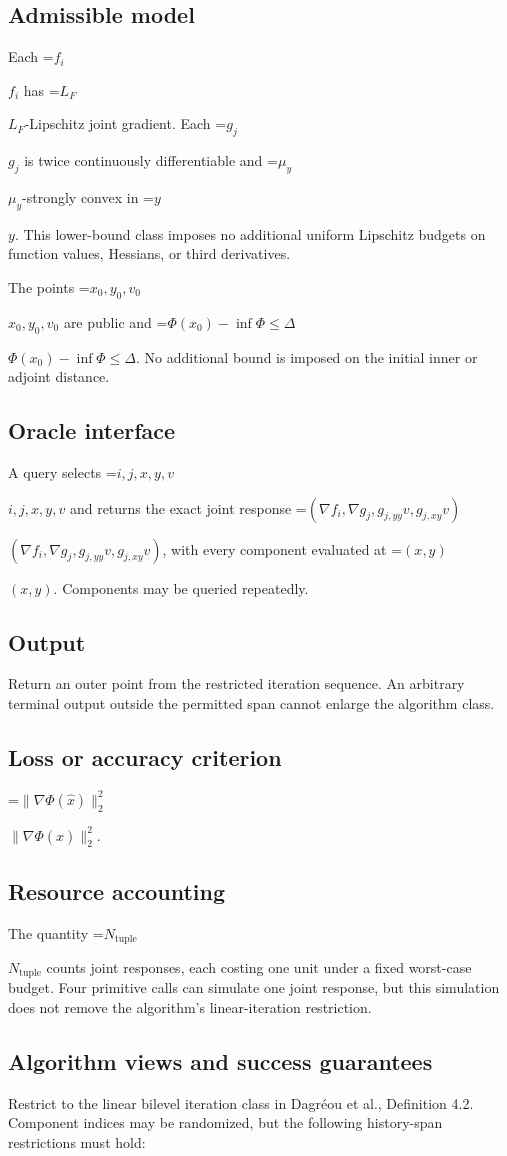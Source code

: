 \documentclass[10pt,a4paper]{article}
\newcommand{\AtlasMath}[1]{\par\begingroup\centering\setbox0=\hbox{$\displaystyle #1$}\ifdim\wd0>1.4\linewidth\typeout{ATLAS WIDE FORMULA: \the\wd0}\fi\ifdim\wd0>\linewidth\resizebox{\linewidth}{!}{\box0}\else\box0\fi\par\endgroup}
\newcommand{\AtlasInlineMath}[1]{\begingroup\setbox0=\hbox{$#1$}\ifdim\wd0>.4\linewidth\endgroup\AtlasMath{#1}\else\endgroup$#1$\fi}
\begin{document}
\subsection{Admissible model}
Each \AtlasInlineMath{f_i} has \AtlasInlineMath{L_F}-Lipschitz joint gradient. Each \AtlasInlineMath{g_j} is twice continuously differentiable and \AtlasInlineMath{\mu_y}-strongly convex in \AtlasInlineMath{y}. This lower-bound class imposes no additional uniform Lipschitz budgets on function values, Hessians, or third derivatives.

The points \AtlasInlineMath{x_0,y_0,v_0} are public and \AtlasInlineMath{\Phi(x_0)-\inf\Phi\le\Delta}. No additional bound is imposed on the initial inner or adjoint distance.

\subsection{Oracle interface}
A query selects \AtlasInlineMath{i,j,x,y,v} and returns the exact joint response \AtlasInlineMath{(\nabla f_i,\nabla g_j,g_{j,yy}v,g_{j,xy}v)}, with every component evaluated at \AtlasInlineMath{(x,y)}. Components may be queried repeatedly.

\subsection{Output}
Return an outer point from the restricted iteration sequence. An arbitrary terminal output outside the permitted span cannot enlarge the algorithm class.

\subsection{Loss or accuracy criterion}
\AtlasInlineMath{\|\nabla\Phi(\widehat{x})\|_2^2}.

\subsection{Resource accounting}
The quantity \AtlasInlineMath{N_{\mathrm{tuple}}} counts joint responses, each costing one unit under a fixed worst-case budget. Four primitive calls can simulate one joint response, but this simulation does not remove the algorithm’s linear-iteration restriction.

\subsection{Algorithm views and success guarantees}
Restrict to the linear bilevel iteration class in Dagréou et al., Definition 4.2. Component indices may be randomized, but the following history-span restrictions must hold:
\end{document}
